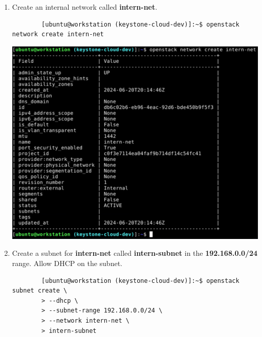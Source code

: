 \documentclass[letterpaper, 12pt]{article}
\begin{document}
\begin{enumerate}
    \item Create an internal network called \textbf{intern-net}.
    \begin{lstlisting}
        [ubuntu@workstation (keystone-cloud-dev)]:~$ openstack network create intern-net
    \end{lstlisting}

    \begin{center}
        \includegraphics[width=\linewidth]{images/part1/step24.png}
    \end{center}

    \item Create a subnet for \textbf{intern-net} called \textbf{intern-subnet} in the \textbf{192.168.0.0/24} range.
    Allow DHCP on the subnet.
    \begin{lstlisting}
        [ubuntu@workstation (keystone-cloud-dev)]:~$ openstack subnet create \
        > --dhcp \
        > --subnet-range 192.168.0.0/24 \
        > --network intern-net \
        > intern-subnet
    \end{lstlisting}


\end{enumerate}
\end{document}
